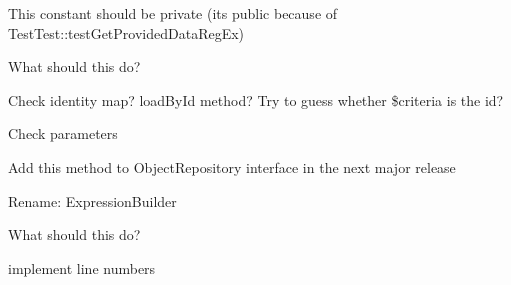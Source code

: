 \begin{DoxyRefList}
%
This constant should be private (it\textquotesingle{}s public because of Test\+Test\+::test\+Get\+Provided\+Data\+Reg\+Ex)  
\item[Global \mbox{\hyperlink{class_laminas_1_1_code_1_1_reflection_1_1_doc_block_reflection_a278338a00e1596bbb1e906bdcf6b0a18}{Doc\+Block\+Reflection\+::export}} ()]\label{todo__todo000044}%
%
What should this do?  
\item[Global \mbox{\hyperlink{interface_doctrine_1_1_o_r_m_1_1_persisters_1_1_entity_1_1_entity_persister_a398cf0c1b5d1b9d9f3c2fef2dd4f72cd}{Entity\+Persister\+::load}} (array \$criteria, \$entity=null, \$assoc=null, array \$hints=\mbox{[}\mbox{]}, \$lock\+Mode=null, \$limit=null, ?array \$order\+By=null)]\label{todo__todo000021}%
%
Check identity map? load\+By\+Id method? Try to guess whether \$criteria is the id?  
\item[Global \mbox{\hyperlink{interface_doctrine_1_1_o_r_m_1_1_persisters_1_1_entity_1_1_entity_persister_ad4e37c13e134bf60aa379b3fd1861f32}{Entity\+Persister\+::load\+By\+Id}} (array \$identifier, \$entity=null)]\label{todo__todo000022}%
%
Check parameters  
\item[Global \mbox{\hyperlink{class_doctrine_1_1_o_r_m_1_1_entity_repository_aac0f9c88ca5e1bacd5816e9039290610}{Entity\+Repository\+::count}} (array \$criteria)]\label{todo__todo000006}%
%
Add this method to {\ttfamily Object\+Repository} interface in the next major release  
\item[Class \mbox{\hyperlink{class_doctrine_1_1_o_r_m_1_1_query_1_1_expr}{Expr}} ]\label{todo__todo000027}%
%
Rename\+: Expression\+Builder  
\item[Global \mbox{\hyperlink{class_laminas_1_1_code_1_1_reflection_1_1_doc_block_1_1_tag_1_1_generic_tag_a7516ca30af0db3cdbf9a7739b48ce91d}{Generic\+Tag\+::\+\_\+\+\_\+to\+String}} ()]\label{todo__todo000043}%
%
What should this do?  
\item[Class \mbox{\hyperlink{class_laminas_1_1_code_1_1_reflection_1_1_property_reflection}{Property\+Reflection}} ]\label{todo__todo000045}%
%
implement line numbers  
\item[Global \mbox{\hyperlink{class_doctrine_1_1_o_r_m_1_1_query_a01cf5342d2200e6b4140a250cde94428}{Query\+::HINT\+\_\+\+FORCE\+\_\+\+PARTIAL\+\_\+\+LOAD}} ]\label{todo__todo000023}%
%

\end{DoxyRefList}
